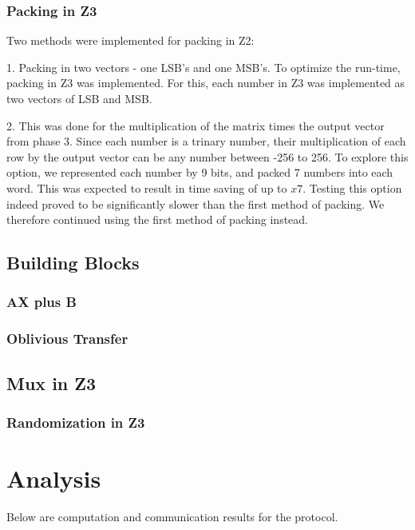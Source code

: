 \subsubsection{Packing in Z3}

Two methods were implemented for packing in Z2:

1.  Packing in two vectors - one LSB's and one MSB's. To optimize the run-time, packing in Z3 was implemented. For this, each number in Z3 was implemented as two vectors of LSB and MSB. 

2.  This was done for the multiplication of the matrix times the output vector from phase 3. Since each number is a trinary number, their multiplication of each row by the output vector can be any number between -256 to 256. To explore this option, we represented each number by 9 bits, and packed 7 numbers into each word. This was expected to result in time saving of up to $x7$. Testing this option indeed proved to be significantly slower than the first method of packing. We therefore continued using the first method of packing instead.

\subsection{Building Blocks}

\subsubsection{AX plus B}

\subsubsection{Oblivious Transfer}

\subsection{Mux in Z3}

\subsubsection{Randomization in Z3}

\section{Analysis}

Below are computation and communication results for the protocol.


